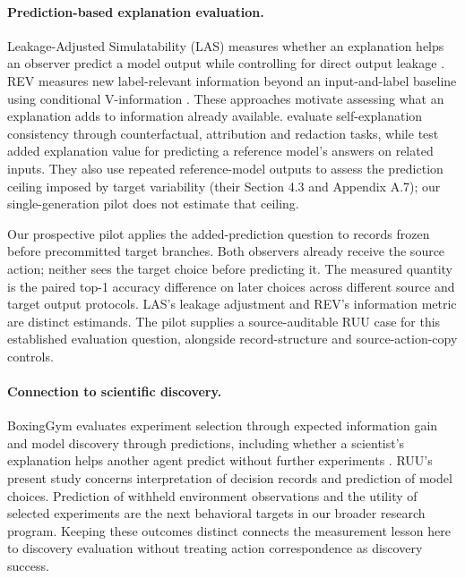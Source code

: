 \paragraph{Prediction-based explanation evaluation.}
Leakage-Adjusted Simulatability (LAS) measures whether an explanation helps an
observer predict a model output while controlling for direct output leakage
\citep{hase2020las}. REV measures new label-relevant information beyond an
input-and-label baseline using conditional V-information \citep{chen2023rev}.
These approaches motivate assessing what an explanation adds to information
already available. \citet{madsen2024self} evaluate self-explanation consistency
through counterfactual, attribution and redaction tasks, while
\citet{mayne2026positive} test added explanation value for predicting a
reference model's answers on related inputs. They also use repeated
reference-model outputs to assess the prediction ceiling imposed by target
variability (their Section 4.3 and Appendix A.7); our single-generation pilot
does not estimate that ceiling.

Our prospective pilot applies the added-prediction question to records frozen
before precommitted target branches. Both observers already receive the source
action; neither sees the target choice before predicting it. The measured
quantity is the paired top-1 accuracy difference on later choices across
different source and target output protocols. LAS's leakage adjustment and
REV's information metric are distinct estimands. The pilot supplies a
source-auditable RUU case for this established evaluation question, alongside
record-structure and source-action-copy controls.

\paragraph{Connection to scientific discovery.}
BoxingGym evaluates experiment selection through expected information gain
and model discovery through predictions, including whether a scientist's
explanation helps another agent predict without further experiments
\citep{gandhi2025boxinggym}. RUU's present study concerns interpretation of
decision records and prediction of model choices. Prediction of withheld
environment observations and the utility of selected experiments are the
next behavioral targets in our broader research program. Keeping these
outcomes distinct connects the measurement lesson here to discovery
evaluation without treating action correspondence as discovery success.

